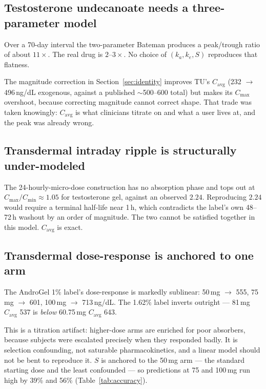 \documentclass[11pt,a4paper]{article}
\begin{document}
\subsection{Testosterone undecanoate needs a three-parameter model}

Over a 70-day interval the two-parameter Bateman produces a peak/trough ratio of
about $11\times$. The real drug is $2$--$3\times$. No choice of $(k_a, k_e, S)$
reproduces that flatness.

The magnitude correction in Section~\ref{sec:identity} improves TU's
$C_{\mathrm{avg}}$ (232 $\to$ 496\,ng/dL exogenous, against a published
$\sim$500--600 total) but makes its $C_{\max}$ overshoot, because correcting
magnitude cannot correct shape. That trade was taken knowingly: $C_{\mathrm{avg}}$
is what clinicians titrate on and what a user lives at, and the peak was already
wrong.

\subsection{Transdermal intraday ripple is structurally under-modeled}

The 24-hourly-micro-dose construction has no absorption phase and tops out at
$C_{\max}/C_{\min} \approx 1.05$ for testosterone gel, against an observed
$2.24$. Reproducing $2.24$ would require a terminal half-life near 1\,h, which
contradicts the label's own 48--72\,h washout by an order of magnitude. The two
cannot be satisfied together in this model. $C_{\mathrm{avg}}$ is exact.

\subsection{Transdermal dose-response is anchored to one arm}

The AndroGel 1\% label's dose-response is markedly sublinear: 50\,mg $\to$ 555,
75\,mg $\to$ 601, 100\,mg $\to$ 713\,ng/dL. The 1.62\% label inverts outright ---
81\,mg $C_{\mathrm{avg}}$ 537 is \emph{below} 60.75\,mg $C_{\mathrm{avg}}$ 643.

This is a titration artifact: higher-dose arms are enriched for poor absorbers,
because subjects were escalated precisely when they responded badly. It is
selection confounding, not saturable pharmacokinetics, and a linear model should
not be bent to reproduce it. $S$ is anchored to the 50\,mg arm --- the standard
starting dose and the least confounded --- so predictions at 75 and 100\,mg run
high by 39\% and 56\% (Table~\ref{tab:accuracy}).
\end{document}
